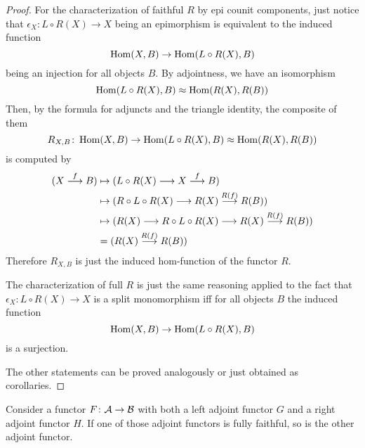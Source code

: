   \begin{proof}
    For the characterization of faithful $R$ by epi counit components, just notice that $\epsilon_X\colon L\circ R(X)\to X$ being an epimorphism is equivalent to the induced function
    \begin{equation*}
      \operatorname{Hom}(X,B)\to\operatorname{Hom}(L\circ R(X),B)
    \end{equation*}
    being an injection for all objects $B$.
    By adjointness, we have an isomorphism
    \begin{equation*}
      \operatorname{Hom}(L\circ R(X),B)\approx\operatorname{Hom}(R(X),R(B))
    \end{equation*}
    Then, by the formula for adjuncts and the triangle identity, the composite of them
    \begin{equation*}
      R_{X,B}\colon\operatorname{Hom}(X,B)\to\operatorname{Hom}(L\circ R(X),B)\approx\operatorname{Hom}(R(X),R(B))
    \end{equation*}
    is computed by
    \begin{align*}
      (X\stackrel{{f}}{\longrightarrow}B)&\mapsto(L\circ R(X)\longrightarrow X\stackrel{{f}}{\longrightarrow} B)\\
       &\mapsto(R\circ L\circ R(X)\longrightarrow R(X)\stackrel{{R(f)}}{\longrightarrow}R(B))\\
       &\mapsto(R(X)\longrightarrow R\circ L\circ R(X)\longrightarrow R(X)\stackrel{{R(f)}}{\longrightarrow}R(B))\\
       &=(R(X)\stackrel{{R(f)}}{\longrightarrow}R(B))
    \end{align*}
    Therefore $R_{X,B}$ is just the induced hom-function of the functor $R$.

    The characterization of full $R$ is just the same reasoning applied to the fact that $\epsilon_X\colon L\circ R(X)\to X$ is a split monomorphism iff for all objects $B$ the induced function
    \begin{equation*}
      \operatorname{Hom}(X,B)\to\operatorname{Hom}(L\circ R(X),B)
    \end{equation*}
    is a surjection.

    The other statements can be proved analogously or just obtained as corollaries.
  \end{proof}
  \begin{prop}\label{prop:two side adjoint}
    Consider a functor $F\colon{\cal A}\to{\cal B}$ with both a left adjoint functor $G$ and a right adjoint functor $H$. If one of those adjoint functors is fully faithful, so is the other adjoint functor.
  \end{prop}

